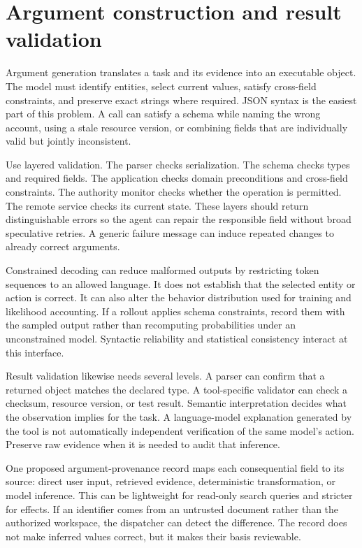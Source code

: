 \section{Argument construction and result validation}\label{sec:C18:arguments}
Argument generation translates a task and its evidence into an executable object. The model must identify entities, select current values, satisfy cross-field constraints, and preserve exact strings where required. JSON syntax is the easiest part of this problem. A call can satisfy a schema while naming the wrong account, using a stale resource version, or combining fields that are individually valid but jointly inconsistent.

Use layered validation. The parser checks serialization. The schema checks types and required fields. The application checks domain preconditions and cross-field constraints. The authority monitor checks whether the operation is permitted. The remote service checks its current state. These layers should return distinguishable errors so the agent can repair the responsible field without broad speculative retries. A generic failure message can induce repeated changes to already correct arguments.

Constrained decoding can reduce malformed outputs by restricting token sequences to an allowed language. It does not establish that the selected entity or action is correct. It can also alter the behavior distribution used for training and likelihood accounting. If a rollout applies schema constraints, record them with the sampled output rather than recomputing probabilities under an unconstrained model. Syntactic reliability and statistical consistency interact at this interface.

Result validation likewise needs several levels. A parser can confirm that a returned object matches the declared type. A tool-specific validator can check a checksum, resource version, or test result. Semantic interpretation decides what the observation implies for the task. A language-model explanation generated by the tool is not automatically independent verification of the same model's action. Preserve raw evidence when it is needed to audit that inference.

One proposed argument-provenance record maps each consequential field to its source: direct user input, retrieved evidence, deterministic transformation, or model inference. This can be lightweight for read-only search queries and stricter for effects. If an identifier comes from an untrusted document rather than the authorized workspace, the dispatcher can detect the difference. The record does not make inferred values correct, but it makes their basis reviewable.

